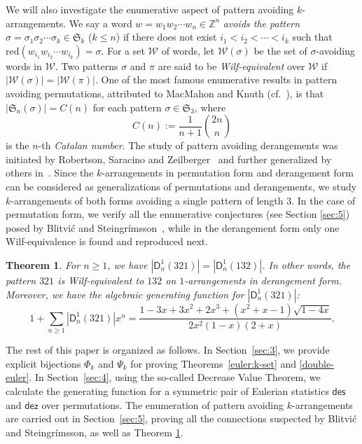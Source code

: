 \documentclass[12pt]{amsart} %
\numberwithin{equation}{section}
\theoremstyle{plain}
\newtheorem{theorem}{Theorem}[section]
\theoremstyle{definition}
\newcommand{\Z}{\mathbb{Z}}
\newcommand\D{\mathsf{D}}
\def\dez{\mathsf{dez}}
\def\reduction{\mathrm{red}}
\def\des{\mathsf{des}}
\def\S{\mathfrak{S}}
\begin{document}
We will also investigate the enumerative aspect of pattern avoiding $k$-arrangements.
We say a word $w=w_1w_2\cdots w_n\in\Z^n$ {\em avoids the pattern} $\sigma=\sigma_1\sigma_2\cdots \sigma_k\in\S_k$ ($k\leq n$) if there does not exist $i_1<i_2<\cdots<i_k$ such that  $\reduction(w_{i_1}w_{i_2}\cdots w_{i_k})=\sigma$. For a set $\mathcal{W}$ of words, let $\mathcal{W}(\sigma)$ be the set of $\sigma$-avoiding words in $\mathcal{W}$. Two patterns $\sigma$ and $\pi$ are said to be {\em Wilf-equivalent} over $\mathcal{W}$ if $|\mathcal{W}(\sigma)|=|\mathcal{W}(\pi)|$. 
%
One of the most famous enumerative results in pattern avoiding permutations, attributed to MacMahon and Knuth (cf.~\cite{ki,ss}), is that $|\S_n(\sigma)|=C(n)$ for each pattern $\sigma\in\S_3$, where 
$$C(n):=\frac{1}{n+1}\binom{2n}{n}
$$ is the $n$-th {\em Catalan number}. The study of pattern avoiding derangements was  initiated by Robertson,  Saracino and  Zeilberger~\cite{rsz}  and further generalized by others in~\cite{eli,ep,ck}. Since the $k$-arrangements in permutation form and derangement form can be considered as generalizations of permutations and derangements, we study $k$-arrangements of both forms avoiding a single  pattern of length $3$. In the case of permutation form, we verify all the enumerative conjectures (see Section \ref{sec:5}) posed by Blitvi\'c and Steingr\'imsson~\cite{bs}, while in the derangement form only one Wilf-equivalence is found
and reproduced next.
\begin{theorem}\label{der:wilf}
For $n\geq1$, we have $|\D_n^1(321)|=|\D_n^1(132)|$. In other words, the pattern $321$
 is Wilf-equivalent to $132$ on $1$-arrangements in derangement form. Moreover, we have the algebraic generating function for $|\D_n^1(321)|$:
 \begin{equation}\label{gen:321der}
 1+\sum_{n\geq1}|\D_n^1(321)|x^n=\frac{1-3x+3x^2+2x^3+(x^2+x-1)\sqrt{1-4x}}{2x^2(1-x)(2+x)}.
 \end{equation}
 \end{theorem}


The rest of this paper is organized as follows. In Section~\ref{sec:3}, we provide explicit bijections $\Phi_k$ and $\Psi_k$ for proving Theorems~\ref{euler:k-set} and \ref{double-euler}. In Section~\ref{sec:4}, using the so-called Decrease Value Theorem, we calculate the generating function for a symmetric pair of Eulerian statistics $\des$ and $\dez$ over permutations. The enumeration of pattern avoiding $k$-arrangements are carried out in Section~\ref{sec:5}, proving all the connections suspected by Blitvi\'c and Steingr\'imsson, as well as 
Theorem \ref{der:wilf}.
\end{document}
